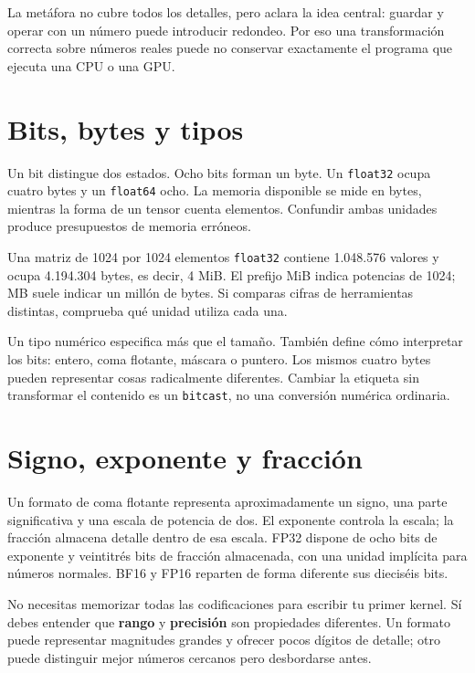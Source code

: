 \documentclass[12pt,a4paper,oneside]{report}
\begin{document}
La metáfora no cubre todos los detalles, pero aclara la idea central: guardar y operar con un número puede introducir redondeo. Por eso una transformación correcta sobre números reales puede no conservar exactamente el programa que ejecuta una CPU o una GPU.

\section{Bits, bytes y tipos}
Un bit distingue dos estados. Ocho bits forman un byte. Un \texttt{float32} ocupa cuatro bytes y un \texttt{float64} ocho. La memoria disponible se mide en bytes, mientras la forma de un tensor cuenta elementos. Confundir ambas unidades produce presupuestos de memoria erróneos.

Una matriz de 1024 por 1024 elementos \texttt{float32} contiene 1.048.576 valores y ocupa 4.194.304 bytes, es decir, 4 MiB. El prefijo MiB indica potencias de 1024; MB suele indicar un millón de bytes. Si comparas cifras de herramientas distintas, comprueba qué unidad utiliza cada una.

Un tipo numérico especifica más que el tamaño. También define cómo interpretar los bits: entero, coma flotante, máscara o puntero. Los mismos cuatro bytes pueden representar cosas radicalmente diferentes. Cambiar la etiqueta sin transformar el contenido es un \texttt{bitcast}, no una conversión numérica ordinaria.

\section{Signo, exponente y fracción}
Un formato de coma flotante representa aproximadamente un signo, una parte significativa y una escala de potencia de dos. El exponente controla la escala; la fracción almacena detalle dentro de esa escala. FP32 dispone de ocho bits de exponente y veintitrés bits de fracción almacenada, con una unidad implícita para números normales. BF16 y FP16 reparten de forma diferente sus dieciséis bits. \cite{ieee-nvidia}

No necesitas memorizar todas las codificaciones para escribir tu primer kernel. Sí debes entender que \textbf{rango} y \textbf{precisión} son propiedades diferentes. Un formato puede representar magnitudes grandes y ofrecer pocos dígitos de detalle; otro puede distinguir mejor números cercanos pero desbordarse antes.
\end{document}
